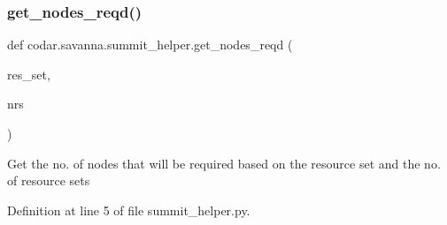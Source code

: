 \subsubsection{\texorpdfstring{get\+\_\+nodes\+\_\+reqd()}{get\_nodes\_reqd()}}
{\footnotesize\ttfamily def codar.\+savanna.\+summit\+\_\+helper.\+get\+\_\+nodes\+\_\+reqd (\begin{DoxyParamCaption}\item[{}]{res\+\_\+set,  }\item[{}]{nrs }\end{DoxyParamCaption})}

\begin{DoxyVerb}Get the no. of nodes that will be required based on the resource set
and the no. of resource sets\end{DoxyVerb}
 

Definition at line 5 of file summit\+\_\+helper.\+py.

